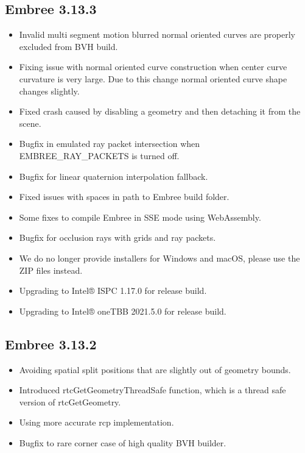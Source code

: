 \subsection{Embree 3.13.3}\label{embree-3.13.3}

\begin{itemize}
\tightlist
\item
  Invalid multi segment motion blurred normal oriented curves are
  properly excluded from BVH build.
\item
  Fixing issue with normal oriented curve construction when center curve
  curvature is very large. Due to this change normal oriented curve
  shape changes slightly.
\item
  Fixed crash caused by disabling a geometry and then detaching it from
  the scene.
\item
  Bugfix in emulated ray packet intersection when EMBREE\_RAY\_PACKETS
  is turned off.
\item
  Bugfix for linear quaternion interpolation fallback.
\item
  Fixed issues with spaces in path to Embree build folder.
\item
  Some fixes to compile Embree in SSE mode using WebAssembly.
\item
  Bugfix for occlusion rays with grids and ray packets.
\item
  We do no longer provide installers for Windows and macOS, please use
  the ZIP files instead.
\item
  Upgrading to Intel® ISPC 1.17.0 for release build.
\item
  Upgrading to Intel® oneTBB 2021.5.0 for release build.
\end{itemize}

\subsection{Embree 3.13.2}\label{embree-3.13.2}

\begin{itemize}
\tightlist
\item
  Avoiding spatial split positions that are slightly out of geometry
  bounds.
\item
  Introduced rtcGetGeometryThreadSafe function, which is a thread safe
  version of rtcGetGeometry.
\item
  Using more accurate rcp implementation.
\item
  Bugfix to rare corner case of high quality BVH builder.
\end{itemize}


